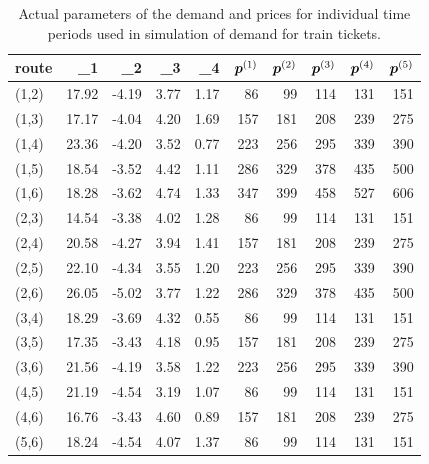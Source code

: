 \begin{table}[ht]
	\centering
	\begin{tabular}{lrrrrrrrrr}
		\toprule
		route & \beta_1 & \beta_2 & \beta_3 & \beta_4 & $\bm{p}^{(1)}$ & $\bm{p}^{(2)}$ & $\bm{p}^{(3)}$ & $\bm{p}^{(4)}$ & $\bm{p}^{(5)}$ \\ 
		\midrule
(1,2) & 17.92 & -4.19 & 3.77 & 1.17 & 86 & 99 & 114 & 131 & 151 \\ 
  (1,3) & 17.17 & -4.04 & 4.20 & 1.69 & 157 & 181 & 208 & 239 & 275 \\ 
  (1,4) & 23.36 & -4.20 & 3.52 & 0.77 & 223 & 256 & 295 & 339 & 390 \\ 
  (1,5) & 18.54 & -3.52 & 4.42 & 1.11 & 286 & 329 & 378 & 435 & 500 \\ 
  (1,6) & 18.28 & -3.62 & 4.74 & 1.33 & 347 & 399 & 458 & 527 & 606 \\ 
  (2,3) & 14.54 & -3.38 & 4.02 & 1.28 & 86 & 99 & 114 & 131 & 151 \\ 
  (2,4) & 20.58 & -4.27 & 3.94 & 1.41 & 157 & 181 & 208 & 239 & 275 \\ 
  (2,5) & 22.10 & -4.34 & 3.55 & 1.20 & 223 & 256 & 295 & 339 & 390 \\ 
  (2,6) & 26.05 & -5.02 & 3.77 & 1.22 & 286 & 329 & 378 & 435 & 500 \\ 
  (3,4) & 18.29 & -3.69 & 4.32 & 0.55 & 86 & 99 & 114 & 131 & 151 \\ 
  (3,5) & 17.35 & -3.43 & 4.18 & 0.95 & 157 & 181 & 208 & 239 & 275 \\ 
  (3,6) & 21.56 & -4.19 & 3.58 & 1.22 & 223 & 256 & 295 & 339 & 390 \\ 
  (4,5) & 21.19 & -4.54 & 3.19 & 1.07 & 86 & 99 & 114 & 131 & 151 \\ 
  (4,6) & 16.76 & -3.43 & 4.60 & 0.89 & 157 & 181 & 208 & 239 & 275 \\ 
  (5,6) & 18.24 & -4.54 & 4.07 & 1.37 & 86 & 99 & 114 & 131 & 151 \\ 
		 \bottomrule
	\end{tabular}
	\caption{Actual parameters of the demand and prices for individual time periods used in simulation of demand for train tickets.}
	\label{tab:betaPrices}
\end{table}

